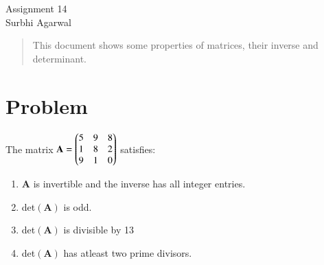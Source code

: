 \documentclass[journal,12pt]{IEEEtran}
\begin{document}
\let\StandardTheFigure\thefigure
\let\vec\mathbf

\renewcommand{\thefigure}{\theproblem}

\def\putbox#1#2#3{\makebox[0in][l]{\makebox[#1][l]{}\raisebox{\baselineskip}[0in][0in]{\raisebox{#2}[0in][0in]{#3}}}}
     \def\rightbox#1{\makebox[0in][r]{#1}}
     \def\centbox#1{\makebox[0in]{#1}}
     \def\topbox#1{\raisebox{-\baselineskip}[0in][0in]{#1}}
     \def\midbox#1{\raisebox{-0.5\baselineskip}[0in][0in]{#1}}
\vspace{3cm}
\begin{center}
\huge Assignment 14\\
\large Surbhi Agarwal\\
\end{center}
\renewcommand{\thefigure}{\theenumi}
\renewcommand{\thetable}{\theenumi}

\begin{abstract}
This document shows some properties of matrices, their inverse and determinant.
\end{abstract}

\section{Problem}
The matrix $\vec{A} = \myvec{5 & 9 & 8\\ 1 & 8 & 2\\ 9 & 1 & 0}$ satisfies:
\begin{enumerate}
    \item $\vec{A}$ is invertible and the inverse has all integer entries.
    \item det$(\vec{A})$ is odd.
    \item det$(\vec{A})$ is divisible by 13
    \item det$(\vec{A})$ has atleast two prime divisors.
\end{enumerate}
\end{document}
